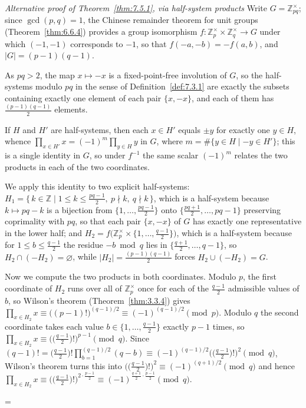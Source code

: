 \documentclass[11pt]{article}
\makeatletter
\let\nt@closedisplay\]
\def\nt@guardedclose{\@ifnextchar\par{\nt@closeafterpar}{\@ifnextchar\end{\postdisplaypenalty\@M\nt@closedisplay}{\nt@closedisplay}}}
\def\nt@closeafterpar\par{\@ifnextchar\par{\nt@closeafterpar}{\@ifnextchar\end{\postdisplaypenalty\@M\nt@closedisplay\par}{\nt@closedisplay\par}}}
\renewenvironment{proof}[1][\proofname]{\par
  \pushQED{\qed}\normalfont\topsep\medskipamount\edef\nt@afterproof{\@endparpenalty=\the\@endparpenalty\relax}\@beginparpenalty\@M\@endparpenalty\@M\let\]\nt@guardedclose\trivlist\item[]\textit{#1\@addpunct{.}} \ignorespaces}{\ifvmode\addpenalty\@M\fi\popQED\nt@afterproof\endtrivlist\@endpefalse}
\theoremstyle{ntstyle}
\newenvironment{altproof}[1][\proofname]
  {\begin{proof}[#1]\renewcommand{\qedsymbol}{}}{\end{proof}}
\newcommand{\ZmodUnits}[1]{\mathbb{Z}_{#1}^{\times}}
\makeatother
\begin{document}
\begin{altproof}[Alternative proof of Theorem~\ref{thm:7.5.1}, via half-system products] Write $G = \ZmodUnits{pq}$; since $\gcd(p, q) = 1$, the Chinese remainder theorem for unit groups (Theorem~\ref{thm:6.6.4}) provides a group
  isomorphism $f : \ZmodUnits{p} \times \ZmodUnits{q} \to G$ under which $(-1, -1)$ corresponds to $-1$, so that
  $f(-a, -b) = -f(a, b)$, and $|G| = (p-1)(q-1)$.

  As $pq > 2$, the map $x \mapsto -x$ is a fixed-point-free involution of $G$, so the half-systems modulo
  $pq$ in the sense of Definition~\ref{def:7.3.1} are exactly the subsets containing
  exactly one element of each pair $\{x, -x\}$, and each of them has
  $\tfrac{(p-1)(q-1)}{2}$ elements.

  If $H$ and $H'$
  are half-systems, then each $x \in H'$ equals $\pm y$ for exactly one
  $y \in H$, whence $\prod_{x \in H'} x = (-1)^{m} \prod_{y \in H} y$ in
  $G$, where $m = \#\{y \in H \mid -y \in H'\}$; this is a single
  identity in $G$, so under $f^{-1}$ the same scalar $(-1)^{m}$ relates
  the two products in each of the two coordinates.

  We apply this identity to two explicit
  half-systems: $H_1 = \{\, k \in \mathbb{Z} \mid 1 \le k \le \tfrac{pq-1}{2},\ p \nmid k,\ q \nmid k \,\}$, which
  is a half-system
  because $k \mapsto pq - k$ is a bijection from $\{1, \ldots, \tfrac{pq-1}{2}\}$ onto $\{\tfrac{pq+1}{2}, \ldots, pq-1\}$
  preserving coprimality with $pq$, so that each pair $\{x, -x\}$ of $G$
  has exactly one representative in the lower half; and
  $H_2 = f\big(\ZmodUnits{p} \times \{1, \ldots, \tfrac{q-1}{2}\}\big)$, which is a half-system because for
  $1 \le b \le \tfrac{q-1}{2}$ the residue $-b \bmod q$ lies in
  $\{\tfrac{q+1}{2}, \ldots, q-1\}$, so $H_2 \cap (-H_2) = \varnothing$,
  while $|H_2| = \tfrac{(p-1)(q-1)}{2}$ forces $H_2 \cup (-H_2) = G$.

  Now we compute the two products in both coordinates. Modulo $p$, the
  first coordinate of $H_2$ runs over all of $\ZmodUnits{p}$
  once for each of the $\tfrac{q-1}{2}$ admissible values of $b$, so
  Wilson's theorem (Theorem~\ref{thm:3.3.4}) gives
  $\prod_{x \in H_2} x \equiv \big((p-1)!\big)^{(q-1)/2} \equiv (-1)^{(q-1)/2} \pmod{p}$. Modulo $q$
  the second coordinate takes each value $b \in \{1, \ldots, \tfrac{q-1}{2}\}$ exactly $p-1$ times, so
  $\prod_{x \in H_2} x \equiv \big(\big(\tfrac{q-1}{2}\big)!\big)^{p-1} \pmod{q}$. Since
  $(q-1)! = \big(\tfrac{q-1}{2}\big)! \prod_{b=1}^{(q-1)/2}(q - b) \equiv (-1)^{(q-1)/2}\big(\big(\tfrac{q-1}{2}\big)!\big)^{2} \pmod{q}$,
  Wilson's theorem turns this into
  $\big(\big(\tfrac{q-1}{2}\big)!\big)^{2} \equiv (-1)^{(q+1)/2} \pmod{q}$ and hence $\prod_{x \in H_2} x \equiv
    \big(\big(\tfrac{q-1}{2}\big)!\big)^{2 \cdot \frac{p-1}{2}} \equiv
    (-1)^{\frac{q+1}{2}\cdot\frac{p-1}{2}} \pmod{q}$.


\end{altproof}
\end{document}
